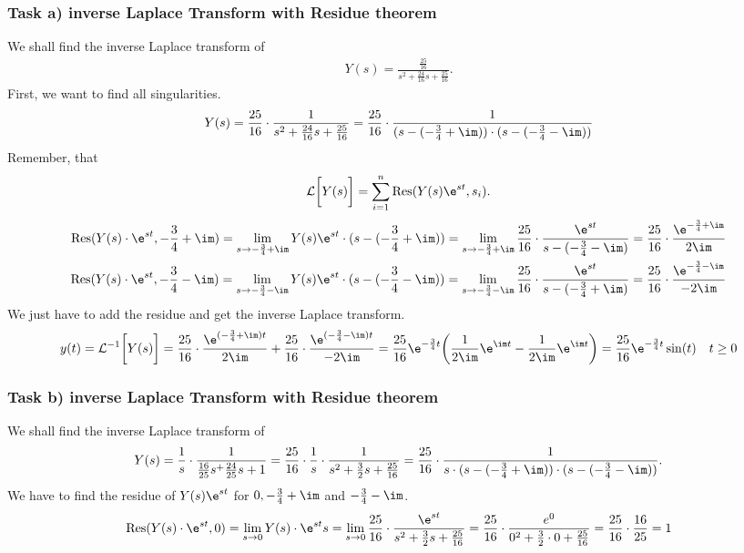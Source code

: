 \subsubsection{Task a) inverse Laplace Transform with Residue theorem}
We shall find the inverse Laplace transform of
\begin{align}
	Y(s)=\frac{\frac{25}{16}}{s^2+\frac{24}{16}s+\frac{25}{16}}. \nonumber
\end{align}
First, we want to find all singularities.
\begin{align}
	Y(s)=\frac{25}{16}\cdot\frac{1}{s^2+\frac{24}{16}s+\frac{25}{16}}=\frac{25}{16}\cdot \frac{1}{(s-(-\frac{3}{4}+\im))\cdot(s-(-\frac{3}{4}-\im))}
\end{align}
Remember, that
\begin{align}
	\mathcal{L}\bigg [Y(s)\bigg ] = \sum_{i=1}^{n}\mathrm{Res}(Y(s)\e^{st},s_i). \nonumber
\end{align}
\begin{align}
	\mathrm{Res}(Y(s)\cdot\e^{st},-\frac{3}{4}+\im)=\lim\limits_{s\rightarrow-\frac{3}{4}+\im}Y(s)\e^{st}\cdot(s-(-\frac{3}{4}+\im))=\lim\limits_{s\rightarrow-\frac{3}{4}+\im}\frac{25}{16}\cdot\frac{\e^{st}}{s-(-\frac{3}{4}-\im)}=\frac{25}{16}\cdot\frac{\e^{-\frac{3}{4}+\im}}{2\im} \nonumber \\
	\mathrm{Res}(Y(s)\cdot\e^{st},-\frac{3}{4}-\im)=\lim\limits_{s\rightarrow-\frac{3}{4}-\im}Y(s)\e^{st}\cdot(s-(-\frac{3}{4}-\im))=\lim\limits_{s\rightarrow-\frac{3}{4}-\im}\frac{25}{16}\cdot\frac{\e^{st}}{s-(-\frac{3}{4}+\im)}=\frac{25}{16}\cdot\frac{\e^{-\frac{3}{4}-\im}}{-2\im}
\end{align}
We just have to add the residue and get the inverse Laplace transform.
\begin{align}
	y(t)=\mathcal{L}^{-1}\bigg [ Y(s) \bigg ]= \frac{25}{16}\cdot\frac{\e^{(-\frac{3}{4}+\im)t}}{2\im}+\frac{25}{16}\cdot\frac{\e^{(-\frac{3}{4}-\im)t}}{-2\im} = \frac{25}{16}\e^{-\frac{3}{4}t}\bigg (\frac{1}{2\im}\e^{\im t}-\frac{1}{2\im}\e^{\im t} \bigg )=\frac{25}{16}\e^{-\frac{3}{4}t}\sin(t)\quad t\geq 0
\end{align}

\subsubsection{Task b) inverse Laplace Transform with Residue theorem}
We shall find the inverse Laplace transform of
\begin{align}
	Y(s) = \frac{1}{s}\cdot \frac{1}{\frac{16}{25}s^+\frac{24}{25}s+1}=\frac{25}{16}\cdot\frac{1}{s}\cdot\frac{1}{s^2+\frac{3}{2}s+\frac{25}{16}}=\frac{25}{16}\cdot\frac{1}{s\cdot(s-(-\frac{3}{4}+\im))\cdot(s-(-\frac{3}{4}-\im))}. \nonumber
\end{align}
We have to find the residue of $Y(s)\e^{st}$ for $0, -\frac{3}{4}+\im$ and $-\frac{3}{4}-\im$.
\begin{align}
	\mathrm{Res}(Y(s)\cdot\e^{st},0)=\lim\limits_{s\rightarrow 0}Y(s)\cdot\e^{st}s=\lim\limits_{s\rightarrow0}\frac{25}{16}\cdot\frac{\e^{st}}{s^2 +\frac{3}{2}s+\frac{25}{16}}=\frac{25}{16}\cdot\frac{e^0}{0^2+\frac{3}{2}\cdot0+\frac{25}{16}}=\frac{25}{16}\cdot\frac{16}{25}=1
\end{align}

